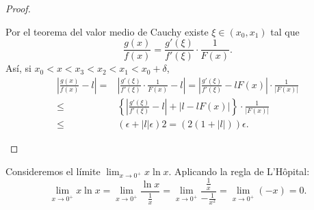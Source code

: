\begin{proof}
\begin{description}
Por el teorema del valor medio de Cauchy existe $\displaystyle \xi \in \left(x_{0}, x_{1}\right) $ tal que
\[ \frac{g\left(x\right)}{f\left(x\right)} = \frac{g'\left(\xi\right)}{f'\left(\xi\right)} \cdot \frac{1}{F\left(x\right)} .\]
Así, si $\displaystyle x_{0} < x < x_{3} < x_{2} < x_{1}< x_{0} + \delta $,
\[
\begin{split}
	\left|\frac{g\left(x\right)}{f\left(x\right)}-l\right| = & \left|\frac{g'\left(\xi\right)}{f'\left(\xi\right)} \cdot \frac{1}{F\left(x\right)} - l\right| 
	=  \left|\frac{g'\left(\xi\right)}{f'\left(\xi\right)}-lF\left(x\right)\right| \cdot \frac{1}{ \left|F\left(x\right)\right|} \\
	\leq & \left\{ \left|\frac{g'\left(\xi\right)}{f'\left(\xi\right)} -l\right| + \left|l - lF\left(x\right)\right|\right\} \cdot \frac{1}{ \left|F\left(x\right)\right|} \\
	\leq & \left(\epsilon + \left|l\right|\epsilon \right)2 = \left(2  \left(1 + \left|l\right|\right)\right) \epsilon .
\end{split}
\]
\end{description}
\end{proof}
\begin{eg}
\normalfont Consideremos el límite $\displaystyle \lim_{x \to 0^{+}}x\ln x $. Aplicando la regla de L'Hôpital:
\[ \lim_{x \to 0^{+}} x\ln x= \lim_{x \to 0^{+}}\frac{\ln x}{\frac{1}{x}} = \lim_{x \to 0^{+}} \frac{\frac{1}{x}}{-\frac{1}{x^{2}}} = \lim_{x \to 0^{+}} \left(- x\right) = 0 .\]
\end{eg}

